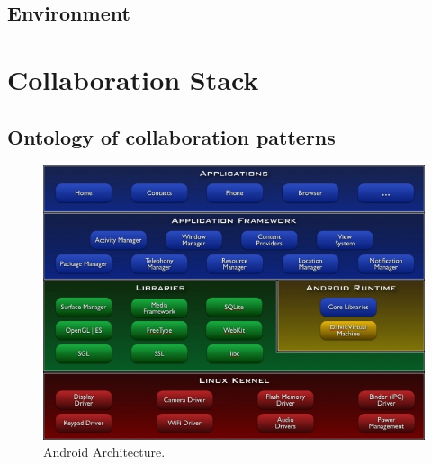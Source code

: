 \subsection{Environment}



\section{Collaboration Stack}

\subsection{Ontology of collaboration patterns}

\begin{figure}[h!]
\centering
\includegraphics[width=1.0\textwidth]{images/chap4_android_architecture.jpg}
\caption{Android Architecture.}
\label{fig:groupware_taxonomy}
\end{figure}

